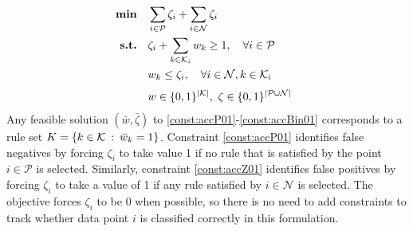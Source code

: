 \documentclass[twoside,11pt]{article}
\begin{document}
\begin{align}
\textbf{min} \quad & \sum_{i\in \cal{P}} \zeta_i +\sum_{i\in \cal{N}} \zeta_i ~~ \label{obj:01}\\
	\textbf{s.t.}  \quad
	& \zeta_i + \sum_{k\in {\cal K}_i} w_k \geq 1 , \quad \forall i \in \cal{P}~~ \label{const:accP01} \\
	& w_k  \leq   \zeta_i , \quad  \forall i \in {\cal N}, k \in {\cal K}_i ~~ \label{const:accZ01} \\[.1cm]
&	w\in \{0,1\}^{\lvert\mathcal{K}\rvert},~ \zeta\in \{0,1\}^{\lvert\mathcal{P} \cup {\cal N}\rvert} ~~ \label{const:accBin01}
\end{align}
Any feasible solution $(\bar w,\bar \zeta)$ to \eqref{const:accP01}-\eqref{const:accBin01} corresponds to a rule set $K=\{k\in\mathcal{K}\::\: \bar w_k=1\}$. 
Constraint \eqref{const:accP01} identifies false negatives by forcing $\zeta_i $ to take value 1 if no rule that is satisfied by the point $i \in \mathcal{P}$ is selected. Similarly, constraint \eqref{const:accZ01} identifies false positives by forcing $\zeta_i$ to take a value of 1 if any rule satisfied by $i \in \mathcal{N}$ is selected. The objective forces $\zeta_i$ to be 0 when possible, so there is no need to add constraints to track whether data point $i$ is classified correctly in this formulation. 

\end{document}
